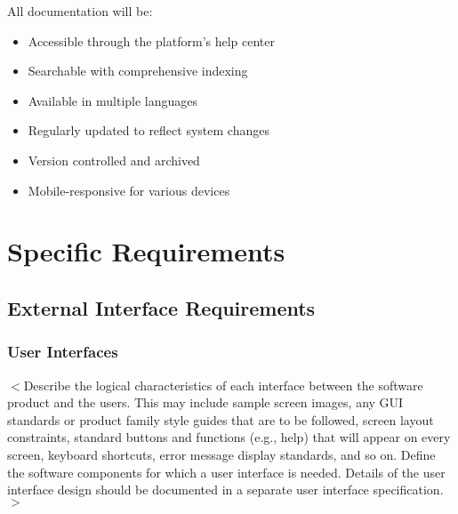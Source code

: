 \documentclass[a4paper, 11pt]{scrreprt}
\begin{document}
All documentation will be:
\begin{itemize}
    \item Accessible through the platform's help center
    \item Searchable with comprehensive indexing
    \item Available in multiple languages
    \item Regularly updated to reflect system changes
    \item Version controlled and archived
    \item Mobile-responsive for various devices
\end{itemize}

\chapter{Specific Requirements}

\section{External Interface Requirements}
\subsection{User Interfaces}
$<$Describe the logical characteristics of each interface between the software 
product and the users. This may include sample screen images, any GUI standards 
or product family style guides that are to be followed, screen layout 
constraints, standard buttons and functions (e.g., help) that will appear on 
every screen, keyboard shortcuts, error message display standards, and so on.  
Define the software components for which a user interface is needed. Details of 
the user interface design should be documented in a separate user interface 
specification.$>$
\end{document}
